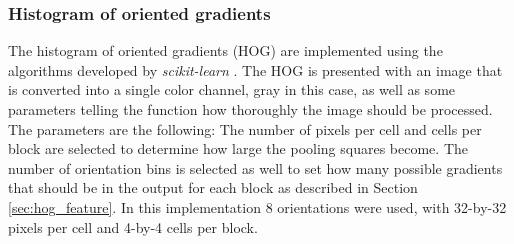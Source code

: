 \subsubsection{Histogram of oriented gradients}
\label{sec:meth:featextr:hog}

The histogram of oriented gradients (HOG) are implemented using the algorithms developed by \emph{scikit-learn} \cite{scikitlearn}. The HOG is presented with an image that is converted into a single color channel, gray in this case, as well as some parameters telling the function how thoroughly the image should be processed. The parameters are the following: The number of pixels per cell and cells per block are selected to determine how large the pooling squares become. The number of orientation bins is selected as well to set how many possible gradients that should be in the output for each block as described in Section \ref{sec:hog_feature}. In this implementation 8 orientations were used, with 32-by-32 pixels per cell and 4-by-4 cells per block. 